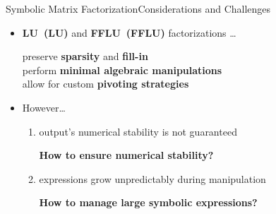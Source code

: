 \begin{frame}{Symbolic Matrix Factorization}{Considerations and Challenges}
  \begin{itemize}
    \item<2-> \textbf{\acl{LU}~(\acs{LU})} and \textbf{\acl{FFLU}~(\acs{FFLU})} factorizations \dots \\
    \begin{small}
      \qquad preserve \textbf{sparsity} and \textbf{fill-in} \\
      \qquad perform \textbf{minimal algebraic manipulations} \\
      \qquad allow for custom \textbf{pivoting strategies}
    \end{small}
  \item<3->However\dots
    \begin{enumerate}
      \normalsize
      \item output's numerical stability is not guaranteed \\
      \begin{small}
        \qquad \textbf{How to ensure numerical stability?}
      \end{small}
      \item expressions grow unpredictably during manipulation \\
      \begin{small}
        \qquad \textbf{How to manage large symbolic expressions?}
      \end{small}
    \end{enumerate}
  \end{itemize}
\end{frame}

